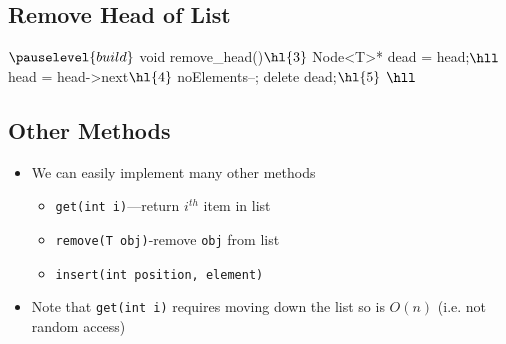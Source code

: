 \begin{slide}
\section{Remove Head of List}

\vspace{-1cm}
\begin{java}$\pauselevel{build}$
    void remove_head()$\hl{3}$
    {
        Node<T>* dead = head;$\hll$
        head = head->next$\hl{4}$
        noElements--;
        delete dead;$\hl{5}$
    }$\hll$
\end{java}\pause{}
\begin{center}
  \pause
\end{center}
\vspace{-1cm}

\end{slide}



\begin{slide}
\section{Other Methods}

\begin{PauseHighLight}
  \begin{itemize}
  \item We can easily implement many other methods\pause
    \begin{itemize}
    \item \texttt{get(int i)}---return $i^{th}$ item in list\pause
    \item \texttt{remove(T obj)}-remove \texttt{obj} from list\pause
    \item \texttt{insert(int position, element)}
    \end{itemize}
  \item Note that \texttt{get(int i)} requires moving down the list so
    is $O(n)$ (i.e. not random access)\pause
  \end{itemize}
\end{PauseHighLight}
\end{slide}



\Outline



